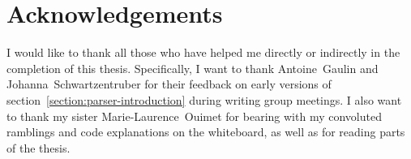 \chapter*{Acknowledgements}

I would like to thank all those who have helped me directly or indirectly in the completion of this thesis.
Specifically, I want to thank Antoine~Gaulin and Johanna~Schwartzentruber for their feedback on early versions of section~\ref{section:parser-introduction} during writing group meetings.
I also want to thank my sister Marie-Laurence~Ouimet for bearing with my convoluted ramblings and code explanations on the whiteboard, as well as for reading parts of the thesis.



